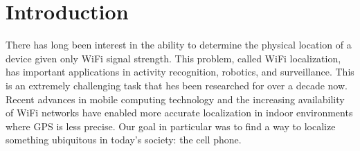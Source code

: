 \section{Introduction}

There has long been interest in the ability to determine the physical
location of a device given only WiFi signal strength. This problem,
called WiFi localization, has important applications in activity
recognition, robotics, and surveillance. This is an extremely
challenging task that hes been researched for over a decade now.
Recent advances in mobile computing technology and the increasing
availability of WiFi networks have enabled more accurate localization
in indoor environments where GPS is less precise. Our goal in particular
was to find a way to localize something ubiquitous in today's society: the 
cell phone.  
